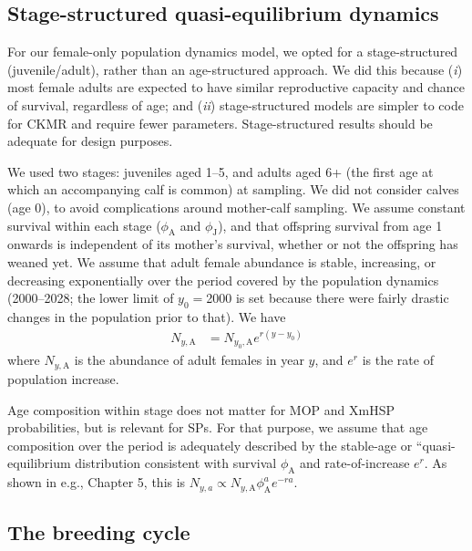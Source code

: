 \subsection{Stage-structured quasi-equilibrium dynamics}

For our female-only population dynamics model, we opted for a stage-structured
(juvenile/adult), rather than an age-structured approach. We did this
because (\textit{i}) most female adults are expected to have similar
reproductive capacity and chance of survival, regardless of age; and
(\textit{ii}) stage-structured models are simpler to code for CKMR
and require fewer parameters. Stage-structured results should be adequate
for design purposes.

We used two stages: juveniles aged 1–5, and adults aged 6+ (the first
age at which an accompanying calf is common) at sampling. We did not
consider calves (age 0), to avoid complications around mother-calf
sampling. We assume constant survival within each stage ($\phi_{\text{A}}$
and $\phi_{\text{J}}$), and that offspring survival from age 1 onwards
is independent of its mother's survival, whether or not the offspring
has weaned yet. We assume that adult female abundance is stable, increasing,
or decreasing exponentially over the period covered by the population
dynamics (2000–2028; the lower limit of $y_{0}=$2000 is set because
there were fairly drastic changes in the population prior to that).
We have
\begin{align}
N_{y,\text{A}} & =N_{y_{0},\text{A}}e^{r(y-y_{0})}\label{popdyn}
\end{align}
where $N_{y,\text{A}}$ is the abundance of adult females in year
$y$, and $e^{r}$ is the rate of population increase.

Age composition within stage does not matter for MOP and XmHSP probabilities,
but is relevant for SPs. For that purpose, we assume that age composition
over the period is adequately described by the stable-age or ``quasi-equilibrium\textquotedbl{}
distribution consistent with survival $\phi_{\text{A}}$ and rate-of-increase
$e^{r}$. As shown in e.g., \citet{keyfitz2005applied} Chapter 5,
this is  $N_{y,a}\propto N_{y,\text{A}}\phi_{\text{A}}^{a}e^{-ra}$.

\subsection{The breeding cycle\label{subsec:The-breeding-cycle}}

